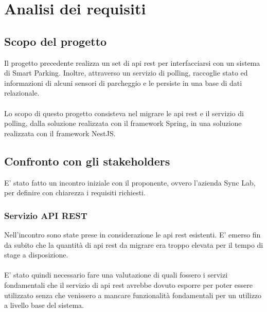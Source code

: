 
\chapter{Analisi dei requisiti}
\label{cap:analisi-requisiti}

\section{Scopo del progetto}
Il progetto precedente realizza un set di \gls{api} \gls{rest} per interfacciarsi con un sistema 
di Smart Parking. Inoltre, attraverso un servizio di polling, raccoglie 
stato ed informazioni di alcuni sensori di parcheggio e le persiste in una base di dati relazionale.
\\\\
Lo scopo di questo progetto consisteva nel migrare le \gls{api} \gls{rest} e il servizio di polling, dalla soluzione
realizzata con il framework Spring, in una soluzione realizzata con il framework NestJS.

\section{Confronto con gli stakeholders}
E' stato fatto un incontro iniziale con il proponente, ovvero l'azienda Sync Lab,
per definire con chiarezza i requisiti richiesti.
\subsection{Servizio API REST}
Nell'incontro sono state prese in considerazione le \gls{api} \gls{rest} esistenti.
E' emerso fin da subito che la quantità di \gls{api} \gls{rest} da migrare era troppo elevata per il
tempo di stage a disposizione. 
\\\\
E' stato quindi necessario fare una valutazione di quali fossero i servizi fondamentali che
il servizio di \gls{api} \gls{rest} avrebbe dovuto esporre per poter essere utilizzato senza che venissero
a mancare funzionalità fondamentali per un utilizzo a livello base del sistema.

